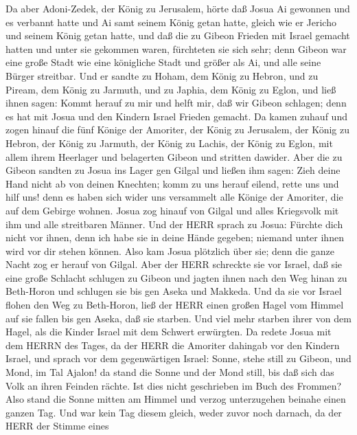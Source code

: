  Da aber Adoni-Zedek, der König zu Jerusalem, hörte daß
Josua Ai gewonnen und es verbannt hatte und Ai samt seinem König getan
hatte, gleich wie er Jericho und seinem König getan hatte, und daß die
zu Gibeon Frieden mit Israel gemacht hatten und unter sie gekommen
waren,  fürchteten sie sich sehr; denn Gibeon war eine große
Stadt wie eine königliche Stadt und größer als Ai, und alle seine Bürger
streitbar.  Und er sandte zu Hoham, dem König zu Hebron, und
zu Piream, dem König zu Jarmuth, und zu Japhia, dem König zu Eglon, und
ließ ihnen sagen:  Kommt herauf zu mir und helft mir, daß
wir Gibeon schlagen; denn es hat mit Josua und den Kindern Israel
Frieden gemacht.  Da kamen zuhauf und zogen hinauf die fünf
Könige der Amoriter, der König zu Jerusalem, der König zu Hebron, der
König zu Jarmuth, der König zu Lachis, der König zu Eglon, mit allem
ihrem Heerlager und belagerten Gibeon und stritten dawider. 
Aber die zu Gibeon sandten zu Josua ins Lager gen Gilgal und ließen ihm
sagen: Zieh deine Hand nicht ab von deinen Knechten; komm zu uns herauf
eilend, rette uns und hilf uns! denn es haben sich wider uns versammelt
alle Könige der Amoriter, die auf dem Gebirge wohnen.  Josua
zog hinauf von Gilgal und alles Kriegsvolk mit ihm und alle streitbaren
Männer.  Und der HERR sprach zu Josua: Fürchte dich nicht
vor ihnen, denn ich habe sie in deine Hände gegeben; niemand unter ihnen
wird vor dir stehen können.  Also kam Josua plötzlich über
sie; denn die ganze Nacht zog er herauf von Gilgal.  Aber
der HERR schreckte sie vor Israel, daß sie eine große Schlacht schlugen
zu Gibeon und jagten ihnen nach den Weg hinan zu Beth-Horon und schlugen
sie bis gen Aseka und Makkeda.  Und da sie vor Israel
flohen den Weg zu Beth-Horon, ließ der HERR einen großen Hagel vom
Himmel auf sie fallen bis gen Aseka, daß sie starben. Und viel mehr
starben ihrer von dem Hagel, als die Kinder Israel mit dem Schwert
erwürgten.  Da redete Josua mit dem HERRN des Tages, da der
HERR die Amoriter dahingab vor den Kindern Israel, und sprach vor dem
gegenwärtigen Israel: Sonne, stehe still zu Gibeon, und Mond, im Tal
Ajalon!  da stand die Sonne und der Mond still, bis daß
sich das Volk an ihren Feinden rächte. Ist dies nicht geschrieben im
Buch des Frommen? Also stand die Sonne mitten am Himmel und verzog
unterzugehen beinahe einen ganzen Tag.  Und war kein Tag
diesem gleich, weder zuvor noch darnach, da der HERR der Stimme eines
